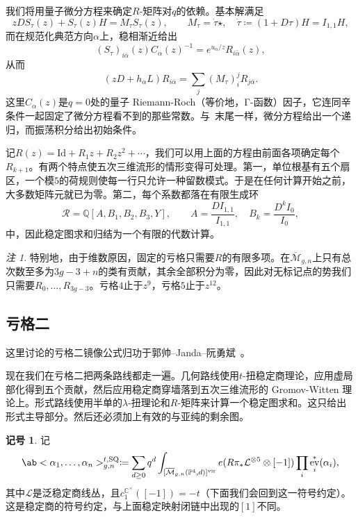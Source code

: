 \documentclass{amsart}
\theoremstyle{definition}
\newtheorem{notn}[thm]{记号}
\theoremstyle{remark}
\newtheorem{rmk}[thm]{注}
\theoremstyle{plain}
\theoremstyle{definition}
\theoremstyle{remark}
\newcommand{\C}{\mathbb{C}}
\newcommand{\Q}{\mathbb{Q}}
\renewcommand{\P}{\mathbb{P}}
\newcommand{\Mbar}{\overline{\mathcal{M}}}
\newcommand{\mc}[1]{\mathcal{#1}}
\newcommand{\mr}[1]{\mathrm{#1}}
\newcommand{\1}{\mathbf{1}}
\newcommand{\2}{\mathbf{2}}
\newcommand{\3}{\mathbf{3}}
\newcommand{\vir}{\mr{vir}}
\DeclareMathOperator{\ev}{ev}
\begin{document}
我们将用量子微分方程来确定\(R\)-矩阵对\(q\)的依赖。基本解满足
\[ zDS_{\tau}(z) + S_{\tau}(z)H = M_{\tau}S_{\tau}(z), \qquad M_{\tau} = \dot{\tau}\star, \quad \dot{\tau} \coloneqq (1+D\tau)H = I_{1,1}H, \]
而在规范化典范方向\(\alpha\)上，稳相渐近给出
\[ (S_{\tau})_{i\bar{\alpha}}(z)C_{\alpha}(z)^{-1} = e^{u_{\alpha}/z}R_{i\bar{\alpha}}(z), \]
从而
\[ (zD+h_{\alpha}L)R_{i\bar{\alpha}} = \sum_j (M_{\tau})_i^j R_{j\bar{\alpha}}. \]
这里\(C_{\alpha}(z)\)是\(q=0\)处的量子 Riemann-Roch（等价地，Γ-函数）因子，它连同辛条件一起固定了微分方程看不到的那些常数。与~末尾一样，微分方程给出一个递归，而振荡积分给出初始条件。

记\(R(z) = \mr{Id} + R_1 z + R_2 z^2 + \cdots\)，我们可以用上面的方程由前面各项确定每个\(R_{k+1}\)。有两个特点使五次三维流形的情形变得可处理。第一，单位根基有五个扇区，一个模\(5\)的荷规则使每一行只允许一种留数模式。于是在任何计算开始之前，大多数矩阵元就已为零。第二，每个系数都落在有限生成环
\[ \mc{R} = \Q[A,B_1,B_2,B_3,Y], \qquad A = \frac{DI_{1,1}}{I_{1,1}}, \quad B_k = \frac{D^k I_0}{I_0}, \]
中，因此稳定图求和归结为一个有限的代数计算。

\begin{rmk}
    特别地，由于维数原因，固定的亏格只需要\(R\)的有限多项。在\(\Mbar_{g,n}\)上只有总次数至多为\(3g-3+n\)的类有贡献，其余全部积分为零，因此对无标记点的势我们只需要\(R_0, \ldots, R_{3g-3}\)。亏格\(4\)止于\(z^9\)，亏格\(5\)止于\(z^{12}\)。
\end{rmk}

\subsection{亏格二}%
\label{sub:Genus two}

这里讨论的亏格二镜像公式归功于郭帅–Janda–阮勇斌~\cite{GJRgenus2}。

现在我们在亏格二把两条路线都走一遍。几何路线使用\(t\)-扭稳定商理论，应用虚局部化得到五个贡献，然后应用稳定商穿墙落到五次三维流形的 Gromov-Witten 理论上。形式路线使用半单的\(\lambda\)-扭理论和\(R\)-矩阵来计算一个稳定图求和。这只给出形式主导部分。然后还必须加上有效的与亚纯的剩余图。

\begin{notn}
    记
    \[ \ab<\alpha_1, \ldots, \alpha_n>^{t,\mr{SQ}}_{g,n} \coloneqq \sum_{d\geq0}q^d \int_{[\Mbar_{g,n}(\P^4,d)]^{\vir}}e(R\pi_*\mc{L}^{\otimes 5}\otimes[-1])\prod_i \ev_i^*(\alpha_i), \]
    其中\(\mc{L}\)是泛稳定商线丛，且\(c_1^{\C^{\times}}([-1]) = -t\)（下面我们会回到这一符号约定）。这是稳定商的符号约定，与上面稳定映射闭链中出现的\([1]\)不同。
\end{notn}
\end{document}
